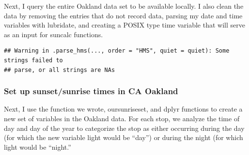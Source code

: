 \documentclass[
]{book}
\newenvironment{Shaded}{\begin{snugshade}}{\end{snugshade}}
\newcommand{\CommentTok}[1]{\textcolor[rgb]{0.56,0.35,0.01}{\textit{#1}}}
\newcommand{\DataTypeTok}[1]{\textcolor[rgb]{0.13,0.29,0.53}{#1}}
\newcommand{\KeywordTok}[1]{\textcolor[rgb]{0.13,0.29,0.53}{\textbf{#1}}}
\newcommand{\NormalTok}[1]{#1}
\newcommand{\OperatorTok}[1]{\textcolor[rgb]{0.81,0.36,0.00}{\textbf{#1}}}
\newcommand{\StringTok}[1]{\textcolor[rgb]{0.31,0.60,0.02}{#1}}
\begin{document}
Next, I query the entire Oakland data set to be available locally. I also clean the data by removing the entries that do not record data, parsing my date and time variables with lubridate, and creating a POSIX type time variable that will serve as an input for suncalc functions.

\begin{Shaded}
\end{Shaded}

\begin{verbatim}
## Warning in .parse_hms(..., order = "HMS", quiet = quiet): Some strings failed to
## parse, or all strings are NAs
\end{verbatim}

\hypertarget{set-up-sunsetsunrise-times-in-ca-oakland}{%
\subsubsection{Set up sunset/sunrise times in CA Oakland}\label{set-up-sunsetsunrise-times-in-ca-oakland}}

Next, I use the function we wrote, oursunriseset, and dplyr functions to create a new set of variables in the Oakland data. For each stop, we analyze the time of day and day of the year to categorize the stop as either occurring during the day (for which the new variable light would be ``day'') or during the night (for which light would be ``night.''
\end{document}
